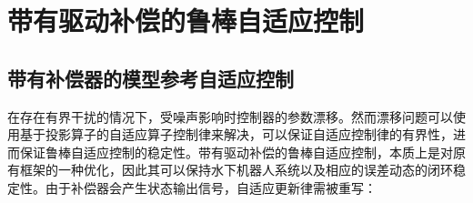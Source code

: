 



\section{带有驱动补偿的鲁棒自适应控制  }

\subsection{带有补偿器的模型参考自适应控制  }

在存在有界干扰的情况下，受噪声影响时控制器的参数漂移。然而漂移问题可以使用基于投影算子的自适应算子控制律来解决，可以保证自适应控制律的有界性，进而保证鲁棒自适应控制的稳定性。带有驱动补偿的鲁棒自适应控制，本质上是对原有框架的一种优化，因此其可以保持水下机器人系统以及相应的误差动态的闭环稳定性。由于补偿器会产生状态输出信号，自适应更新律需被重写：

